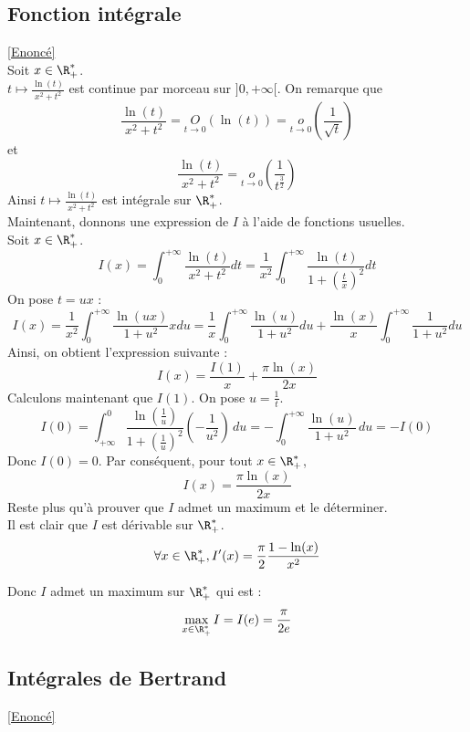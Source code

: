 \documentclass{book}
\begin{document}
	\subsection{Fonction intégrale }
	\label{Fonction intégrale corrigé}
	\textcolor{blue}{\hyperref[fonction_intégrale]{[Enoncé]}}\\
	Soit $x\in\R^*_+$.\\
	$\displaystyle t\mapsto \frac{\ln(t)}{x^2+t^2}$ est continue par morceau sur $]0,+\infty[$. 
	On remarque que \[\frac{\ln(t)}{x^2+t^2}=\underset{t \to 0}{O}\left(\ln(t)\right)=\underset{t \to 0}{o}\left(\frac{1}{\sqrt{t}}\right)\]
	et \[\frac{\ln(t)}{x^2+t^2}=\underset{t \to 0}{o}\left(\frac{1}{t^{\frac{3}{2}}}\right)\]
	Ainsi $\displaystyle t\mapsto \frac{\ln(t)}{x^2+t^2}$ est intégrale sur $\R^*_+$.\\
	Maintenant, donnons une expression de $I$ à l'aide de fonctions usuelles.\\
	Soit $x\in\R^*_+$.
	\[I(x)=\int_{0}^{+\infty}\frac{\ln(t)}{x^2+t^2}dt=\frac{1}{x^2}\int_{0}^{+\infty}\frac{\ln(t)}{1+\left(\frac{t}{x}\right)^2}dt\]
	On pose $t=ux$ : \[I(x)=\frac{1}{x^2}\int_{0}^{+\infty}\frac{\ln(ux)}{1+u^2}xdu=\frac{1}{x}\int_{0}^{+\infty}\frac{\ln(u)}{1+u^2}du+\frac{\ln(x)}{x}\int_{0}^{+\infty}\frac{1}{1+u^2}du\]
	Ainsi, on obtient l'expression suivante : \[I(x)=\frac{I(1)}{x}+\frac{\pi\ln(x)}{2x}\]
	Calculons maintenant que $I(1)$.
	On pose $u=\frac{1}{t}$.
	\[I(0)=\int_{+\infty}^{0}\frac{\ln\left(\frac{1}{u}\right)}{1+\left(\frac{1}{u}\right)^2}\left(-\frac{1}{u^2}\right)\,du
	=-\int_{0}^{+\infty}\frac{\ln(u)}{1+u^2}\,du=-I(0)\]
	Donc $I(0)=0$.
	Par conséquent, pour tout $x\in\R^*_+$, \[I(x)=\frac{\pi\ln(x)}{2x}\]
	Reste plus qu'à prouver que $I$ admet un maximum et le déterminer.\\
	Il est clair que $I$ est dérivable sur $\R^*_+$.\\
	\[\forall x\in\R^*_+, I'(x)=\frac{\pi}{2}\frac{1-\ln(x)}{x^2}\]
	
	\begin{center}
	\end{center}
	Donc $I$ admet un maximum sur $\R^*_+$ qui est : \[\max\limits_{x\in\R^*_+}I=I(e)=\frac{\pi}{2e}\]
	
	\subsection{Intégrales de Bertrand}
	\label{Intégrales de Bertrand corrigé}
	\textcolor{blue}{\hyperref[Intégrales de Bertrand]{[Enoncé]}}\\
	
\end{document}
